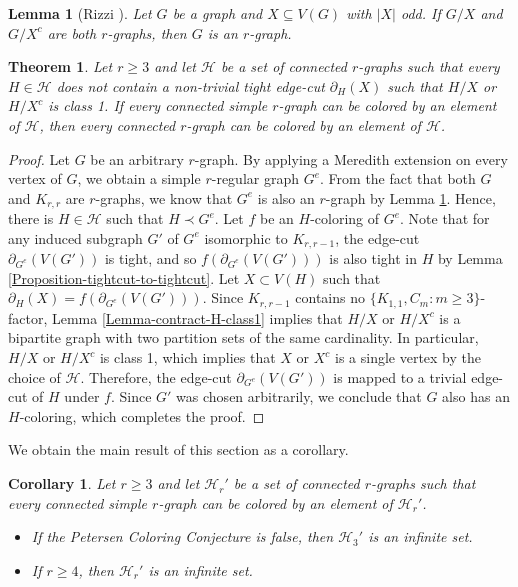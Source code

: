 \documentclass[a4paper,11pt]{article}
\newcommand{\ca}{\mathcal}
\newtheorem{theo}[defi]{Theorem}
\newtheorem{lem}[defi]{Lemma}
\newtheorem{cor}[defi]{Corollary}
\theoremstyle{remark}
\begin{document}
\begin{lem}[Rizzi \cite{rizzi1999indecomposable}]\label{Lemma-keep-r-graph}
	Let $ G $ be a graph and $ X\subseteq V(G) $ with $ |X| $ odd. If $G/X$ and $G/X^c$ are both $ r $-graphs, then $ G $ is an $r$-graph.
\end{lem}

 


\begin{theo}\label{theo:reduction_simple_case}
	Let $r\geq 3$ and let $\ca H$ be a set of connected $r$-graphs such that every  $H\in \ca H$ does not contain a  non-trivial tight edge-cut $\partial_H(X)$ such that  $H/X$ or $H/X^c$ is class 1.
	If 
	every connected simple $r$-graph can be colored by an element of $\ca H$, 
then every connected $r$-graph can be colored by an element of $\ca H$.
\end{theo}

\begin{proof}
Let $G$ be an arbitrary $r$-graph. By applying a Meredith extension on every vertex of $ G $, we obtain a simple $ r $-regular graph $ G^e $. From the fact that both $ G $ and $ K_{r,r} $ are $ r $-graphs, we know that $ G^{e} $ is also an $ r $-graph by Lemma \ref{Lemma-keep-r-graph}. Hence, there is $H \in \ca H$ such that $H \prec G^{e} $. Let $f$ be an $ H $-coloring of $G^e$. Note that for any induced subgraph $ G' $ of $ G^e $ isomorphic to $ K_{r,r-1}$, the edge-cut $ \partial_{G^e }  (V(G'))$   is tight, and so $f(\partial_{G^e }  (V( G')))$ is also tight in $ H $ by Lemma \ref{Proposition-tightcut-to-tightcut}. Let $X \subset V(H)$ such that $\partial_{H}(X)=f(\partial_{G^e }  (V( G')))$. Since  $ K_{r,r-1} $  contains no $ \{K_{1,1}, C_m\colon m\geq3\} $-factor, Lemma \ref{Lemma-contract-H-class1} implies that  $H/X$ or $H/X^c$ is a bipartite graph with two partition sets of the same cardinality. In particular,   $H/X$ or $H/X^c$ is class 1, which implies that $X$ or $X^c$ is a single vertex by the choice of $ \ca H $. Therefore, the edge-cut $\partial_{G^e }  (V( G'))$  is mapped to a trivial edge-cut of $ H $ under $ f $. Since $ G' $ was chosen arbitrarily, we conclude that $G$ also has an $ H $-coloring, which completes the proof.
\end{proof}




We obtain the main result of this section as a corollary.

\begin{cor}\label{cor:color-simple-r-graphs}
	Let $ r\geq3 $ and let $\ca H_r'$ be a set of connected $r$-graphs such that every connected simple $r$-graph can be colored by an element of $\ca H_r'$.
\begin{itemize}
\item[$i)$] If the Petersen Coloring Conjecture is false, then $\ca H_3'$ is an infinite set.
\item[$ii)$] If $r \geq 4$, then $\ca H_r'$ is an infinite set. 
\end{itemize}	
	 
\end{cor}
\end{document}
